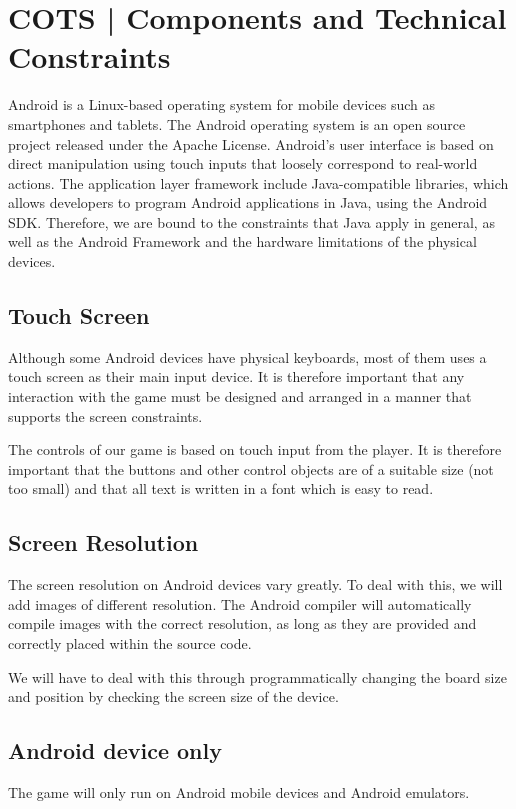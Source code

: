 \section{COTS | Components and Technical Constraints}
\label{sec:COTS}
Android is a Linux-based operating system for mobile devices such as
smartphones and tablets. The Android operating system is an open source project released under the Apache License. Android's user interface is based on direct manipulation using touch inputs that loosely correspond to real-world actions. The application layer framework include
Java-compatible libraries, which allows developers to program Android
applications in Java, using the Android SDK\@. Therefore, we are bound to the
constraints that Java apply in general, as well as the Android Framework and
the hardware limitations of the physical devices. 

\subsection{Touch Screen}
Although some Android devices have physical keyboards, most of them uses a
touch screen as their main input device. It is therefore important that any
interaction with the game must be designed and arranged in a manner that
supports the screen constraints. 

The controls of our game is based on touch input from the player. It is therefore important that the buttons and other control objects are of a suitable size (not too small) and that all text is written in a font which is easy to read.

\subsection{Screen Resolution}
The screen resolution on Android devices vary greatly. To deal with this, we
will add images of different resolution. The Android compiler will
automatically compile images with the correct resolution, as long as they are
provided and correctly placed within the source code.

We will have to deal with this through programmatically changing the board size and position by checking the screen size of the device. 

\subsection{Android device only}
The game will only run on Android mobile devices and Android emulators.

